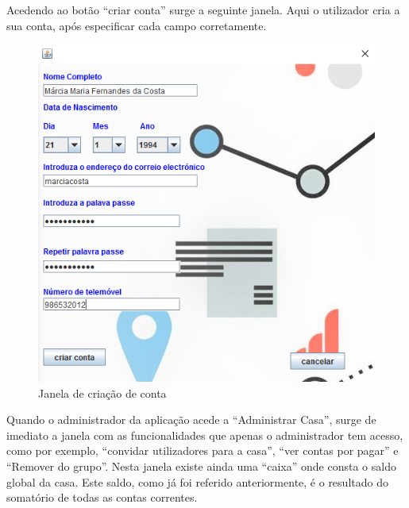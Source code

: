 Acedendo ao botão “criar conta” surge a seguinte janela. Aqui o utilizador cria a sua conta, após especificar cada campo corretamente.

\begin{figure}[h!]
	\centering
	\includegraphics[scale=0.6]{imagens/interface/criarconta}  
	\caption{Janela de criação de conta}  
\end{figure}

\newpage \clearpage

Quando o administrador da aplicação acede a “Administrar Casa”, surge de imediato a janela com as funcionalidades que apenas o administrador tem acesso, como por exemplo, “convidar utilizadores para a casa”, “ver contas por pagar” e “Remover do grupo”. Nesta janela existe ainda uma “caixa” onde consta o saldo global da casa. Este saldo, como já foi referido anteriormente, é o resultado do somatório de todas as contas correntes. 


